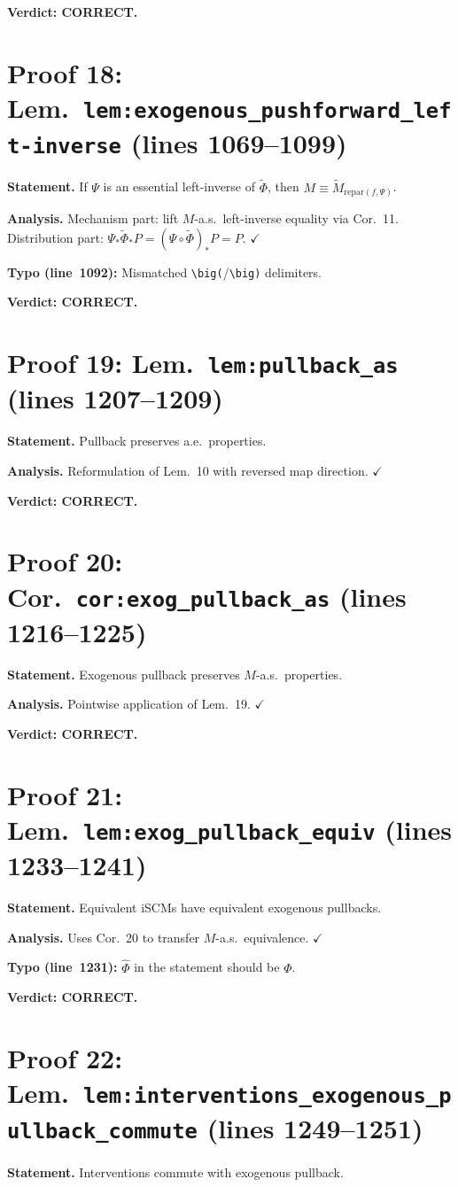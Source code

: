 \documentclass{article}
\begin{document}
\textbf{Verdict: CORRECT.}

\section{Proof 18: Lem.\ \texttt{lem:exogenous\_pushforward\_left-inverse}
(lines 1069--1099)}
\textbf{Statement.} If $\Psi$ is an essential left-inverse of $\tilde\Phi$,
then $M\equiv\tilde M_{\mathrm{repar}(f,\Psi)}$.

\textbf{Analysis.} Mechanism part: lift $M$-a.s.\ left-inverse equality via
Cor.~11.  Distribution part: $\Psi_*\tilde\Phi_*P=(\Psi\circ\tilde\Phi)_*P=P$.
$\checkmark$

\textbf{Typo (line~1092):} Mismatched \verb|\big(|/\verb|\big)| delimiters.

\textbf{Verdict: CORRECT.}

\section{Proof 19: Lem.\ \texttt{lem:pullback\_as} (lines 1207--1209)}
\textbf{Statement.} Pullback preserves a.e.\ properties.

\textbf{Analysis.} Reformulation of Lem.~10 with reversed map direction.
$\checkmark$

\textbf{Verdict: CORRECT.}

\section{Proof 20: Cor.\ \texttt{cor:exog\_pullback\_as} (lines 1216--1225)}
\textbf{Statement.} Exogenous pullback preserves $M$-a.s.\ properties.

\textbf{Analysis.} Pointwise application of Lem.~19.  $\checkmark$

\textbf{Verdict: CORRECT.}

\section{Proof 21: Lem.\ \texttt{lem:exog\_pullback\_equiv} (lines 1233--1241)}
\textbf{Statement.} Equivalent iSCMs have equivalent exogenous pullbacks.

\textbf{Analysis.} Uses Cor.~20 to transfer $M$-a.s.\ equivalence.  $\checkmark$

\textbf{Typo (line~1231):} $\hat\Phi$ in the statement should be $\Phi$.

\textbf{Verdict: CORRECT.}

\section{Proof 22: Lem.\ \texttt{lem:interventions\_exogenous\_pullback\_commute}
(lines 1249--1251)}
\textbf{Statement.} Interventions commute with exogenous pullback.
\end{document}
